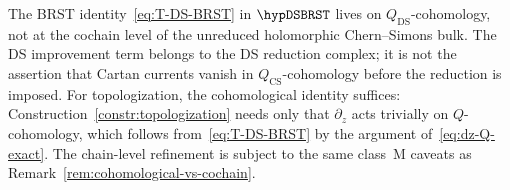 \begin{remark}
\label{rem:E3-DS-cohomological-level}
The BRST identity~\eqref{eq:T-DS-BRST} in \(\hypDSBRST\) lives on
\(Q_{\mathrm{DS}}\)-cohomology, not at the cochain level of the
unreduced holomorphic Chern--Simons bulk.  The DS improvement term
belongs to the DS reduction complex; it is not the assertion that
Cartan currents vanish in \(Q_{\mathrm{CS}}\)-cohomology before the
reduction is imposed.  For topologization, the cohomological identity
suffices:
Construction~\ref{constr:topologization} needs only that
$\partial_z$ acts trivially on $Q$-cohomology, which
follows from~\eqref{eq:T-DS-BRST} by the argument
of~\eqref{eq:dz-Q-exact}.
The chain-level refinement is subject to the same
class~M caveats as
Remark~\ref{rem:cohomological-vs-cochain}.
\end{remark}

